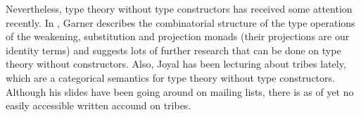 \documentclass{article}
\begin{document}
Nevertheless, type theory without type constructors has received some attention
recently. In \cite{Garner2014}, Garner describes the combinatorial structure
of the type operations of the weakening, substitution and projection monads
(their projections are our identity terms) and suggests lots of further research
that can be done on type theory without constructors. Also, Joyal has been
lecturing about tribes lately, which are a categorical semantics for type theory
without type constructors. Although his slides have been going around on
mailing lists, there is as of yet no easily accessible written accound on tribes.







%

%

%



\end{document}

